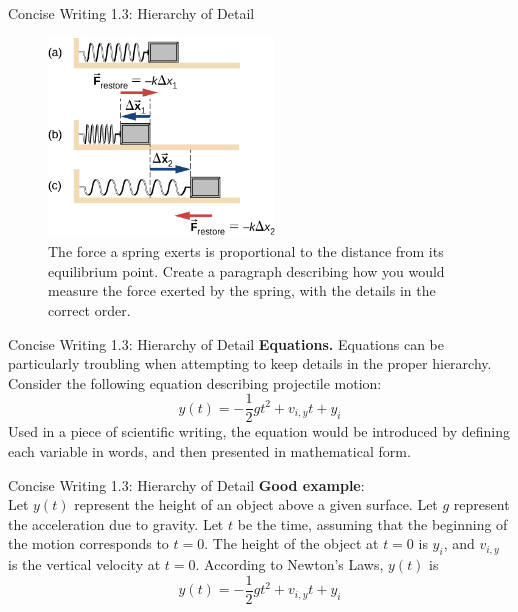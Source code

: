 \documentclass{beamer}
\begin{document}
\begin{frame}{Concise Writing 1.3: Hierarchy of Detail}
\begin{figure}
\includegraphics[width=6cm]{figures/spring.jpeg}
\caption{\label{fig:spring} The force a spring exerts is proportional to the distance from its equilibrium point.  Create a paragraph describing how you would measure the force exerted by the spring, with the details in the correct order.}
\end{figure}
\end{frame}

\begin{frame}{Concise Writing 1.3: Hierarchy of Detail}
\alert{\textbf{Equations.}}  Equations can be particularly troubling when attempting to keep details in the proper hierarchy.  Consider the following equation describing projectile motion:
\begin{equation}
y(t) = -\frac{1}{2}gt^2 + v_{i,y} t + y_i
\end{equation}
Used in a piece of scientific writing, the equation would be introduced by defining each variable in words, and then presented in mathematical form.
\end{frame}

\begin{frame}{Concise Writing 1.3: Hierarchy of Detail}
\alert{\textbf{Good example}}: \\
Let $y(t)$ represent the height of an object above a given surface.  Let $g$ represent the acceleration due to gravity.  Let $t$ be the time, assuming that the beginning of the motion corresponds to $t = 0$.  The height of the object at $t = 0$ is $y_i$, and $v_{i,y}$ is the vertical velocity at $t = 0$.  According to Newton's Laws, $y(t)$ is
\begin{equation}
y(t) = -\frac{1}{2}gt^2 + v_{i,y} t + y_i
\end{equation}
\end{frame}
\end{document}
